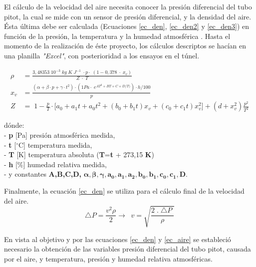 
El cálculo de la velocidad del aire necesita conocer la presión diferencial del tubo pitot, la cual se mide con un sensor de presión diferencial, y la densidad del aire. Ésta última debe ser calculada (Ecuaciones  \ref{ec_den}, \ref{ec_den2} y \ref{ec_den3}) en función de la presión, la temperatura y la humedad atmosférica \cite{airecalculo}.
Hasta el momento de la realización de éste proyecto, los cálculos descriptos se hacían en una planilla \textit{"{}Excel"}, con posterioridad a los ensayos en el túnel.



\begin{align}
	\rho&=\frac{3,48353\;10^{-3}\;kg\;K\;J^{-1}\;\cdot p\cdot\;(1-0,378\;\cdot\;x_v)}{Z\;\cdot\;T} \label{ec_den}\\
	x_v&=\frac{(\alpha+\beta\cdot p+\gamma\cdot t^2)\cdot(1Pa\cdot\;e^{AT^2+BT+C+D/T)})\cdot h/100}p\label{ec_den2}\\
	Z&=\;1-\frac pT\cdot\lbrack a_0+a_1t+a_0t^2+(b_0+b_1t)x_v+(c_0+c_1t)x_v^2\rbrack+(d+x_v^2)\frac{p^2}{T^2}\label{ec_den3}
\end{align}

dónde:\\
- \textbf{p } [Pa] presión atmosférica medida,\\
- \textbf{t } [$^{\circ}$C] temperatura medida,\\
- \textbf{T } [K] temperatura absoluta (\textbf{T}=\textbf{t} + 273,15 \textbf{K})\\
- \textbf{h } [\%] humedad relativa medida,\\
- y constantes \textbf{A,B,C,D,} $\boldsymbol{\alpha , \beta  , \gamma , a_0, a_1 ,a_2 ,b_0  ,b_1 , c_0 , c_1, D. }$


Finalmente, la ecuación  \ref{ec_den} se utiliza para el cálculo final de la velocidad del aire.
\begin{equation}
	\triangle P=\frac{v^2\rho}2\rightarrow\;\;v=\sqrt{\frac{2\;.\;\triangle P\;}\rho}
	\label{ec_aire}
\end{equation}

En vista al objetivo y por las ecuaciones \ref{ec_den} y \ref{ec_aire} se estableció necesario la obtención de las variables presión diferencial del tubo pitot, causada por el aire, y temperatura, presión y humedad relativa atmosféricas.

